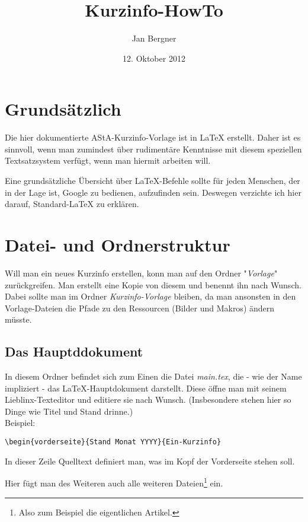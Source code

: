 \documentclass[a4paper,10pt]{article}
\title{Kurzinfo-HowTo}
\author{Jan Bergner}
\date{12. Oktober 2012}
\begin{document}
\maketitle

\newpage

\section{Grundsätzlich}
Die hier dokumentierte AStA-Kurzinfo-Vorlage ist in \LaTeX{} erstellt. Daher ist es sinnvoll, wenn man zumindest über rudimentäre Kenntnisse mit diesem speziellen Textsatzsystem verfügt, wenn man hiermit arbeiten will.

Eine grundsätzliche Übersicht über \LaTeX{}-Befehle sollte für jeden Menschen, der in der Lage ist, Google zu bedienen, aufzufinden sein. Deswegen verzichte ich hier darauf, Standard-\LaTeX{} zu erklären.


\section{Datei- und Ordnerstruktur}
Will man ein neues Kurzinfo erstellen, konn man auf den Ordner "\textit{Vorlage}" zurückgreifen. Man erstellt eine Kopie von diesem und benennt ihn nach Wunsch. Dabei sollte man im Ordner \textit{Kurzinfo-Vorlage} bleiben, da man ansonsten in den Vorlage-Dateien die Pfade zu den Ressourcen (Bilder und Makros) ändern müsste.

\subsection*{Das Hauptddokument}
In diesem Ordner befindet sich zum Einen die Datei \textit{main.tex}, die - wie der Name impliziert - das \LaTeX{}-Hauptdokument darstellt. Diese öffne man mit seinem Lieblinx-Texteditor und editiere sie nach Wunsch. (Insbesondere stehen hier so Dinge wie Titel und Stand drinne.)\\

Beispiel:
\begin{verbatim}
\begin{vorderseite}{Stand Monat YYYY}{Ein-Kurzinfo}
\end{verbatim}
In dieser Zeile Quelltext definiert man, was im Kopf der Vorderseite stehen soll.

Hier fügt man des Weiteren auch alle weiteren Dateien\footnote{Also zum Beispiel die eigentlichen Artikel.} ein.\\
\end{document}
